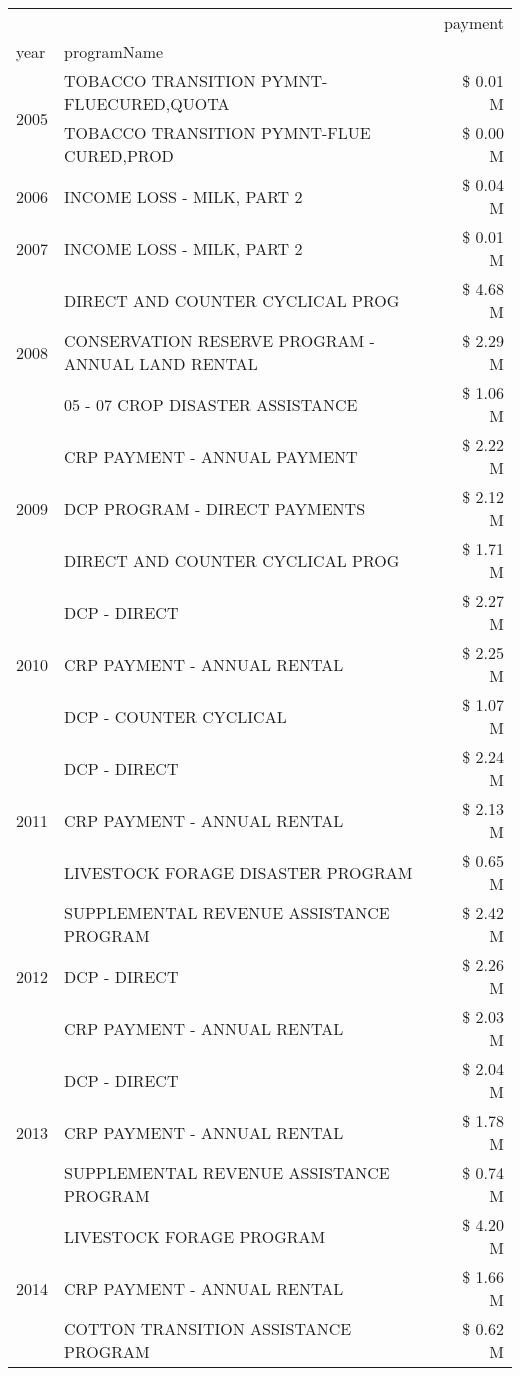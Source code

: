 \begin{tabular}{llr}
\toprule
 &  & payment \\
year & programName &  \\
\midrule
\multirow[t]{2}{*}{2005} & TOBACCO TRANSITION PYMNT-FLUECURED,QUOTA & \$ 0.01 M \\
 & TOBACCO TRANSITION PYMNT-FLUE CURED,PROD & \$ 0.00 M \\
\cline{1-3}
2006 & INCOME LOSS - MILK, PART 2 & \$ 0.04 M \\
\cline{1-3}
2007 & INCOME LOSS - MILK, PART 2 & \$ 0.01 M \\
\cline{1-3}
\multirow[t]{3}{*}{2008} & DIRECT AND COUNTER CYCLICAL PROG & \$ 4.68 M \\
 & CONSERVATION RESERVE PROGRAM - ANNUAL LAND RENTAL & \$ 2.29 M \\
 & 05 - 07 CROP DISASTER ASSISTANCE & \$ 1.06 M \\
\cline{1-3}
\multirow[t]{3}{*}{2009} & CRP PAYMENT - ANNUAL PAYMENT & \$ 2.22 M \\
 & DCP PROGRAM - DIRECT PAYMENTS & \$ 2.12 M \\
 & DIRECT AND COUNTER CYCLICAL PROG & \$ 1.71 M \\
\cline{1-3}
\multirow[t]{3}{*}{2010} & DCP - DIRECT & \$ 2.27 M \\
 & CRP PAYMENT - ANNUAL RENTAL & \$ 2.25 M \\
 & DCP - COUNTER CYCLICAL & \$ 1.07 M \\
\cline{1-3}
\multirow[t]{3}{*}{2011} & DCP - DIRECT & \$ 2.24 M \\
 & CRP PAYMENT - ANNUAL RENTAL & \$ 2.13 M \\
 & LIVESTOCK FORAGE DISASTER PROGRAM & \$ 0.65 M \\
\cline{1-3}
\multirow[t]{3}{*}{2012} & SUPPLEMENTAL REVENUE ASSISTANCE PROGRAM & \$ 2.42 M \\
 & DCP - DIRECT & \$ 2.26 M \\
 & CRP PAYMENT - ANNUAL RENTAL & \$ 2.03 M \\
\cline{1-3}
\multirow[t]{3}{*}{2013} & DCP - DIRECT & \$ 2.04 M \\
 & CRP PAYMENT - ANNUAL RENTAL & \$ 1.78 M \\
 & SUPPLEMENTAL REVENUE ASSISTANCE PROGRAM & \$ 0.74 M \\
\cline{1-3}
\multirow[t]{3}{*}{2014} & LIVESTOCK FORAGE PROGRAM & \$ 4.20 M \\
 & CRP PAYMENT - ANNUAL RENTAL & \$ 1.66 M \\
 & COTTON TRANSITION ASSISTANCE PROGRAM & \$ 0.62 M \\

\end{tabular}
